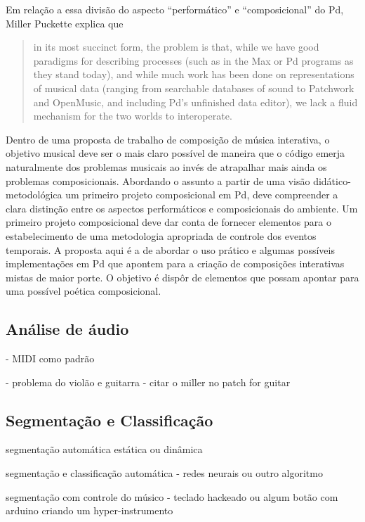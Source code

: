 \documentclass[draft]{ppgmus}
\begin{document}
Em relação a essa divisão do aspecto ``performático'' e
``composicional'' do Pd, Miller Puckette explica que

\begin{quote}
  in its most succinct form, the problem is that, while we have good
  paradigms for describing processes (such as in the Max or Pd
  programs as they stand today), and while much work has been done on
  representations of musical data (ranging from searchable databases
  of sound to Patchwork and OpenMusic, and including Pd's unfinished
  data editor), we lack a fluid mechanism for the two worlds to
  interoperate. \cite{puckette04:divide}
\end{quote}

Dentro de uma proposta de trabalho de composição de música interativa,
o objetivo musical deve ser o mais claro possível de maneira que o
código emerja naturalmente dos problemas musicais ao invés de
atrapalhar mais ainda os problemas composicionais. Abordando o assunto
a partir de uma visão didático-metodológica um primeiro projeto
composicional em Pd, deve compreender a clara distinção entre os
aspectos performáticos e composicionais do ambiente. Um primeiro
projeto composicional deve dar conta de fornecer elementos para o
estabelecimento de uma metodologia apropriada de controle dos eventos
temporais. A proposta aqui é a de abordar o uso prático e algumas
possíveis implementações em Pd que apontem para a criação de
composições interativas mistas de maior porte. O objetivo é dispôr de
elementos que possam apontar para uma possível poética composicional.


\subsection{Análise de áudio}


- MIDI como padrão

- problema do violão e guitarra - citar o miller no patch for guitar


\subsection{Segmentação e Classificação}

segmentação automática estática ou dinâmica

segmentação e classificação automática - redes neurais ou outro algoritmo

segmentação com controle do músico - teclado hackeado ou
algum botão com arduino criando um hyper-instrumento
\end{document}
